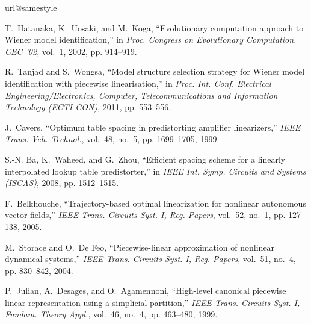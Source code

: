 \documentclass[a4paper,english]{IEEEtran}
\begin{document}
\begin{thebibliography}{10}
\providecommand{\url}[1]{#1}
\csname url@samestyle\endcsname
\providecommand{\newblock}{\relax}
\providecommand{\bibinfo}[2]{#2}
\providecommand{\BIBentrySTDinterwordspacing}{\spaceskip=0pt\relax}
\providecommand{\BIBentryALTinterwordstretchfactor}{4}
\providecommand{\BIBentryALTinterwordspacing}{\spaceskip=\fontdimen2\font plus
\BIBentryALTinterwordstretchfactor\fontdimen3\font minus
  \fontdimen4\font\relax}
\providecommand{\BIBforeignlanguage}[2]{{\expandafter\ifx\csname l@#1\endcsname\relax
\typeout{** WARNING: IEEEtran.bst: No hyphenation pattern has been}\typeout{** loaded for the language `#1'. Using the pattern for}\typeout{** the default language instead.}\else
\language=\csname l@#1\endcsname
\fi
#2}}
\providecommand{\BIBdecl}{\relax}
\BIBdecl

T.~Hatanaka, K.~Uosaki, and M.~Koga, ``{Evolutionary computation approach to
  Wiener model identification},'' in \emph{{Proc. Congress on Evolutionary
  Computation. CEC '02}}, vol.~1, 2002, pp. 914--919.

R.~Tanjad and S.~Wongsa, ``{Model structure selection strategy for Wiener model
  identification with piecewise linearisation},'' in \emph{{Proc. Int. Conf.
  Electrical Engineering/Electronics, Computer, Telecommunications and
  Information Technology (ECTI-CON)}}, 2011, pp. 553--556.

J.~Cavers, ``{Optimum table spacing in predistorting amplifier linearizers},''
  \emph{IEEE Trans. Veh. Technol.}, vol.~48, no.~5, pp. 1699--1705, 1999.

S.-N. Ba, K.~Waheed, and G.~Zhou, ``{Efficient spacing scheme for a linearly
  interpolated lookup table predistorter},'' in \emph{{IEEE Int. Symp. Circuits
  and Systems (ISCAS)}}, 2008, pp. 1512--1515.

F.~Belkhouche, ``{Trajectory-based optimal linearization for nonlinear
  autonomous vector fields},'' \emph{IEEE Trans. Circuits Syst. I, Reg.
  Papers}, vol.~52, no.~1, pp. 127--138, 2005.

M.~Storace and O.~{De Feo}, ``{Piecewise-linear approximation of nonlinear
  dynamical systems},'' \emph{IEEE Trans. Circuits Syst. I, Reg. Papers},
  vol.~51, no.~4, pp. 830--842, 2004.

P.~Julian, A.~Desages, and O.~Agamennoni, ``{High-level canonical piecewise
  linear representation using a simplicial partition},'' \emph{IEEE Trans.
  Circuits Syst. I, Fundam. Theory Appl.}, vol.~46, no.~4, pp. 463--480, 1999.


\end{thebibliography}
\end{document}
